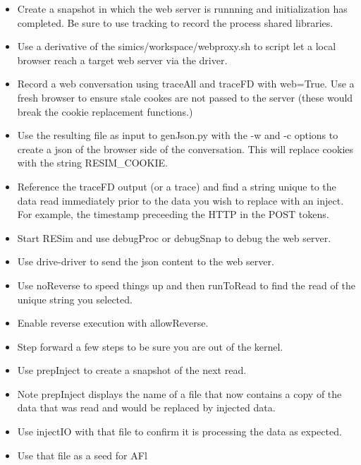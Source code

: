 \documentclass[titlepage]{article}
\begin{document}
\begin{itemize}
\item Create a snapshot in which the web server is runnning and initialization has
completed.  Be sure to use tracking to record the process shared libraries.

\item Use a derivative of the simics/workspace/webproxy.sh to script let a local browser
reach a target web server via the driver.

\item Record a web conversation using traceAll and traceFD with web=True.  Use a fresh browser
to ensure stale cookes are not passed to the server (these would break the cookie replacement
functions.)

\item Use the resulting file as input to genJson.py with the -w and -c options to
create a json of the browser side of the conversation.  This will replace cookies with
the string RESIM\_COOKIE.

\item Reference the traceFD output (or a trace) and find a string unique to the 
data read immediately prior to the data you wish to replace with an inject.  
For example, the timestamp preceeding the HTTP in the POST tokens.

\item Start RESim and use debugProc or debugSnap to debug the web server.

\item Use drive-driver to send the json content to the web server.

\item Use noReverse to speed things up and then runToRead to find the read of the unique string you selected.

\item Enable reverse execution with allowReverse.

\item Step forward a few steps to be sure you are out of the kernel.

\item Use prepInject to create a snapshot of the next read.

\item Note prepInject displays the name of a file that now contains a copy of the 
data that was read and would be replaced by injected data.

\item Use injectIO with that file to confirm it is processing the data as expected.

\item Use that file as a seed for AFl
\end{itemize}
\end{document}
